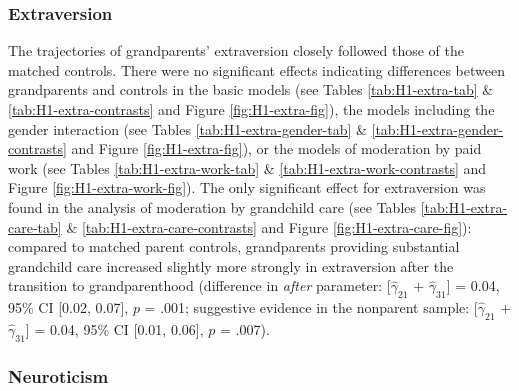 \documentclass[
  english,
  man, noextraspace]{apa7}
\begin{document}
\hypertarget{extraversion}{%
\subsubsection{Extraversion}\label{extraversion}}

The trajectories of grandparents' extraversion closely followed those of the matched controls. There were no significant effects indicating differences between grandparents and controls in the basic models (see Tables \ref{tab:H1-extra-tab} \& \ref{tab:H1-extra-contrasts} and Figure \ref{fig:H1-extra-fig}), the models including the gender interaction (see Tables \ref{tab:H1-extra-gender-tab} \& \ref{tab:H1-extra-gender-contrasts} and Figure \ref{fig:H1-extra-fig}), or the models of moderation by paid work (see Tables \ref{tab:H1-extra-work-tab} \& \ref{tab:H1-extra-work-contrasts} and Figure \ref{fig:H1-extra-work-fig}). The only significant effect for extraversion was found in the analysis of moderation by grandchild care (see Tables \ref{tab:H1-extra-care-tab} \& \ref{tab:H1-extra-care-contrasts} and Figure \ref{fig:H1-extra-care-fig}): compared to matched parent controls, grandparents providing substantial grandchild care increased slightly more strongly in extraversion after the transition to grandparenthood (difference in \emph{after} parameter: {[}\(\hat{\gamma}_{21}\) + \(\hat{\gamma}_{31}\){]} = 0.04, 95\% CI {[}0.02, 0.07{]}, \(p\) = .001; suggestive evidence in the nonparent sample: {[}\(\hat{\gamma}_{21}\) + \(\hat{\gamma}_{31}\){]} = 0.04, 95\% CI {[}0.01, 0.06{]}, \(p\) = .007).

\hypertarget{neuroticism}{%
\subsubsection{Neuroticism}\label{neuroticism}}
\end{document}
